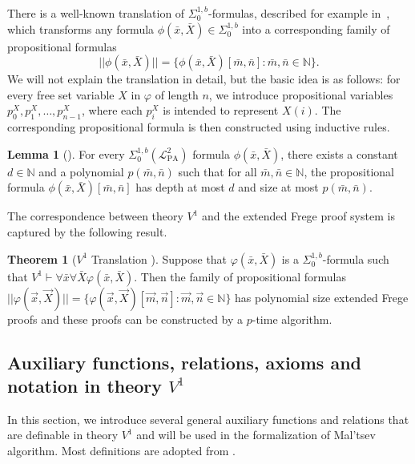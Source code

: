 \documentclass{article}
\theoremstyle{definition}
\theoremstyle{theorem}
\newtheorem{thm}{Theorem}
\newtheorem{lem}{Lemma}
\theoremstyle{theorem}
\theoremstyle{remark}
\theoremstyle{remark}
\theoremstyle{example}
\theoremstyle{notation}
\theoremstyle{theorem}
\begin{document}
There is a well-known translation of $\Sigma^{1,b}_0$-formulas, described for example in~\cite{10.5555/1734064}, which transforms any formula $\phi(\bar{x}, \bar{X}) \in \Sigma^{1,b}_0$ into a corresponding family of propositional formulas
\begin{equation}
||\phi(\bar{x},\bar{X})|| = \{\phi(\bar{x},\bar{X})[\bar{m},\bar{n}]: \bar{m},\bar{n} \in \mathbb{N}\}.
\end{equation}
We will not explain the translation in detail, but the basic idea is as follows: for every free set variable $X$ in $\varphi$ of length $n$, we introduce propositional variables $p^X_0, p^X_1, \ldots, p^X_{n - 1}$, where each $p^X_i$ is intended to represent $X(i)$. The corresponding propositional formula is then constructed using inductive rules. 

\begin{lem}[\cite{10.5555/1734064}]\label{LPropositionalTranslation} For every $\Sigma^{1,b}_0(\mathcal{L}^2_{\mathrm{PA}})$ formula $\phi(\bar{x}, \bar{X})$, there exists a constant $d \in \mathbb{N}$ and a polynomial $p(\bar{m}, \bar{n})$ such that for all $\bar{m}, \bar{n} \in \mathbb{N}$, the propositional formula $\phi(\bar{x}, \bar{X})[\bar{m}, \bar{n}]$ has depth at most $d$ and size at most $p(\bar{m}, \bar{n})$.
\end{lem}
The correspondence between theory $V^1$ and the extended Frege proof system is captured by the following result. 

\begin{thm}[$V^1$ Translation \cite{10.5555/1734064}] \label{Translation} Suppose that $\varphi(\bar{x},\bar{X})$ is a $\Sigma^{1,b}_0$-formula such that $
V^1 \vdash \forall\bar{x}\forall\bar{X}\varphi(\bar{x},\bar{X})
$.
Then the family of propositional formulas $||\varphi(\vec{x},\vec{X})||= \{\varphi(\vec{x},\vec{X})[\vec{m},\vec{n}]: \vec{m},\vec{n} \in \mathbb{N}\}$ has polynomial size extended Frege proofs and these proofs can be constructed by a $p$-time algorithm.
\end{thm}





\subsection{Auxiliary functions, relations, axioms and notation in theory $V^1$}\label{asdkjfg;lkg}

In this section, we introduce several general auxiliary functions and relations that are definable in theory $V^1$ and will be used in the formalization of Mal'tsev algorithm. Most definitions are adopted from \cite{10.5555/1734064}. 
\end{document}
